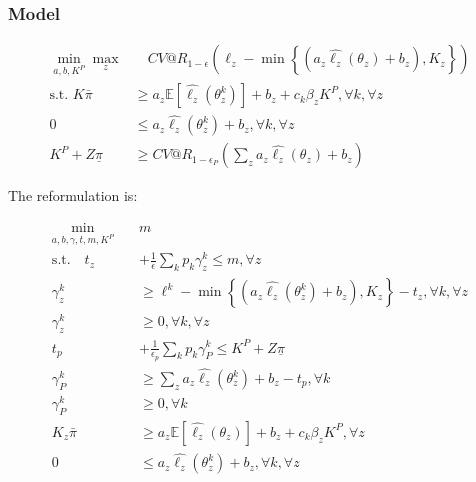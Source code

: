 \documentclass[11pt]{article}
\begin{document}
    \subsubsection*{Model}
    
    \begin{align}
        \min_{a,b,K^P} \max_z &\quad CV@R_{1-\epsilon}(\ell_z - \min\left\{(a_z\hat{\ell_z}(\theta_z) + b_z), K_z\right\})\\
        \text{s.t.   } K\bar{\pi} &\geq a_z \mathbb{E}[\hat{\ell_z}(\theta^k_z)] + b_z + c_k\beta_z K^P,  \forall k, \forall z\\
        0 &\leq a_z\hat{\ell_z}(\theta^k_z) + b_z, \forall k, \forall z \\
        K^P + Z\underline{\pi} &\geq CV@R_{1-\epsilon_P}\left( \sum_z a_z \hat{\ell_z}(\theta_z) + b_z \right)
    \end{align}
    
    The reformulation is: 
    
    \begin{align}
        \min_{a,b,\gamma,t,m,K^P} \quad & m\\
        \text{s.t.} \quad t_z &+ \frac{1}{\epsilon} \sum_k p_k \gamma_z^k \leq m, \forall z\\
        \gamma_z^k &\geq \ell^k - \min\left\{(a_z\hat{\ell_z}(\theta_z^k) + b_z), K_z\right\} -t_z, \forall k, \forall z \\
        \gamma_z^k &\geq 0, \forall k, \forall z\\
        t_p &+ \frac{1}{\epsilon_p} \sum_k p_k \gamma_P^k \leq K^P+Z\underline{\pi}\\
        \gamma_P^k &\geq \sum_z a_z \hat{\ell_z}(\theta^k_z) + b_z -t_p, \forall k \\
        \gamma_P^k &\geq 0, \forall k\\
        K_z\bar{\pi} &\geq a_z \mathbb{E}[\hat{\ell_z}(\theta_z)] + b_z + c_k \beta_z K^P, \forall z \\
        0 &\leq a_z \hat{\ell_z}(\theta_z^k) + b_z, \forall k, \forall z
    \end{align}
\end{document}
